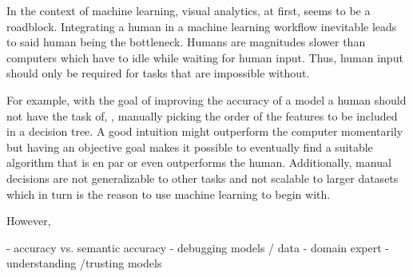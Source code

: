 In the context of machine learning, visual analytics, at first, seems to be a roadblock.
Integrating a human in a machine learning workflow inevitable leads to said human being the bottleneck.
Humans are magnitudes slower than computers which have to idle while waiting for human input.
Thus, human input should only be required for tasks that are impossible without.

For example, with the goal of improving the accuracy of a model a human should not have the task of, \eg, manually picking the order of the features to be included in a decision tree.
A good intuition might outperform the computer momentarily but having an objective goal makes it possible to eventually find a suitable algorithm that is en par or even outperforms the human.
Additionally, manual decisions are not generalizable to other tasks and not scalable to larger datasets which in turn is the reason to use machine learning to begin with.

However, \todo{}

- accuracy vs. semantic accuracy
- debugging models / data
- domain expert
- understanding /trusting models